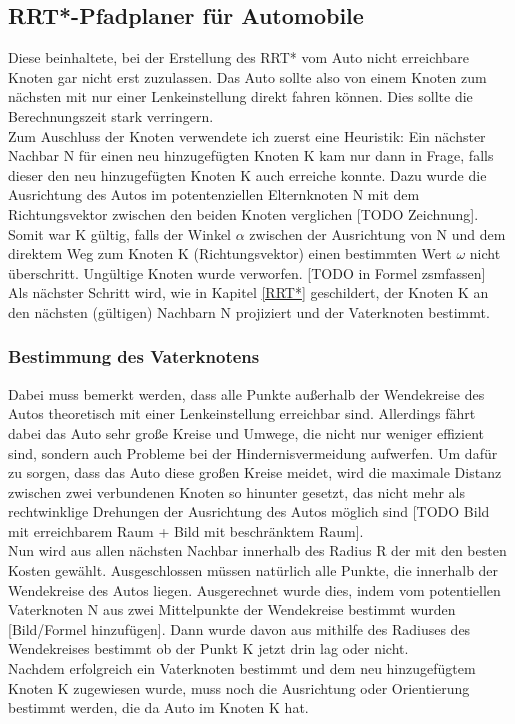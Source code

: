 \subsection{RRT*-Pfadplaner für Automobile}
\label{Metrik}
Diese beinhaltete, bei der Erstellung des RRT* vom Auto nicht erreichbare Knoten gar nicht erst zuzulassen. Das Auto sollte also von einem Knoten zum nächsten mit nur einer Lenkeinstellung direkt fahren können. Dies sollte die Berechnungszeit stark verringern. \\
Zum Auschluss der Knoten verwendete ich zuerst eine Heuristik: Ein nächster Nachbar N für einen neu hinzugefügten Knoten K kam nur dann in Frage, falls dieser den neu hinzugefügten Knoten K auch erreiche konnte. Dazu wurde die Ausrichtung des Autos im potentenziellen Elternknoten N mit dem Richtungsvektor zwischen den beiden Knoten verglichen [TODO Zeichnung]. Somit war K gültig, falls der Winkel $\alpha$ zwischen der Ausrichtung von N und dem direktem Weg zum Knoten K (Richtungsvektor) einen bestimmten Wert $\omega$ nicht überschritt. Ungültige Knoten wurde verworfen. [TODO in Formel zsmfassen]\\
Als nächster Schritt wird, wie in Kapitel \ref{RRT*} geschildert, der Knoten K an den nächsten (gültigen) Nachbarn N projiziert und der Vaterknoten bestimmt. 

\subsubsection{Bestimmung des Vaterknotens}
Dabei muss bemerkt werden, dass alle Punkte außerhalb der Wendekreise des Autos theoretisch mit einer Lenkeinstellung erreichbar sind. Allerdings fährt dabei das Auto sehr große Kreise und Umwege, die nicht nur weniger effizient sind, sondern auch Probleme bei der Hindernisvermeidung aufwerfen. Um dafür zu sorgen, dass das Auto diese großen Kreise meidet, wird die maximale Distanz zwischen zwei verbundenen Knoten so hinunter gesetzt, das nicht mehr als rechtwinklige Drehungen der Ausrichtung des Autos möglich sind [TODO Bild mit erreichbarem Raum + Bild mit beschränktem Raum]. \\
Nun wird aus allen nächsten Nachbar innerhalb des Radius R der mit den besten Kosten gewählt. Ausgeschlossen müssen natürlich alle Punkte, die innerhalb der Wendekreise des Autos liegen. Ausgerechnet wurde dies, indem vom potentiellen Vaterknoten N aus zwei Mittelpunkte der Wendekreise bestimmt wurden [Bild/Formel hinzufügen]. Dann wurde davon aus mithilfe des Radiuses des Wendekreises bestimmt ob der Punkt K jetzt drin lag oder nicht. \\
Nachdem erfolgreich ein Vaterknoten bestimmt und dem neu hinzugefügtem Knoten K zugewiesen wurde, muss noch die Ausrichtung oder Orientierung bestimmt werden, die da Auto im Knoten K hat.
